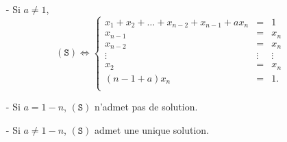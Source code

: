 \begin{question}
\begin{explanations}
\begin{enumerate}
\item[-]Si $a\neq 1$, $$(\mathtt{S})  \Leftrightarrow \left\{\begin{array}{rcc}
x_1+x_2+\dots+ x_{n-2}+x_{n-1}+ax_n   &=&1\\
x_{n-1}&=&x_n\\
x_{n-2}&=&x_n\\
\vdots &\vdots&\vdots\\
x_2&=&x_n\\
(n-1+a)x_n&=&1.\\
\end{array}\right.$$
\item[-]Si $a=1-n$, $(\mathtt{S})$ n'admet pas de solution.
\item[-]Si $a\neq 1-n$, $(\mathtt{S})$ admet une unique solution.
\end{enumerate}
\end{explanations}
\end{question}

